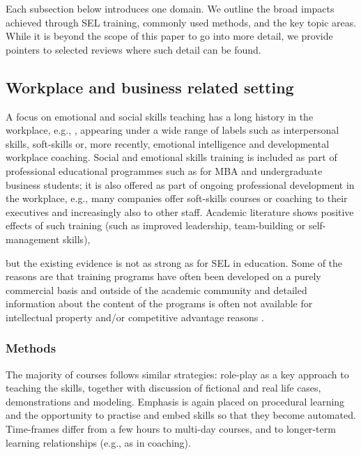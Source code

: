\documentclass[prodmode,acmtochi]{acmsmall}
\newcommand{\GeraldineFIX}[1]{}
\begin{document}
Each subsection below introduces one domain. We outline the broad impacts achieved through SEL training, commonly used methods, and the key topic areas. While it is beyond the scope of this paper to go into more detail, we provide pointers to selected reviews where such detail can be found.
 
  

\subsection{Workplace and business related setting}

A focus on emotional and social skills teaching has a long history in the workplace, e.g.,  \cite{Bailey1983,Bailey1983a}, appearing under a wide range of labels such as interpersonal skills, soft-skills or, more recently, emotional intelligence and developmental workplace coaching. Social and emotional skills training is included as part of professional educational programmes such as for MBA and undergraduate business students; it is also offered as part of ongoing professional development in the workplace, e.g., many companies offer soft-skills courses or coaching to their executives and increasingly also to other staff. 
%
Academic literature shows positive effects of such training (such as improved leadership, team-building or self-management skills),
\GeraldineFIX{G: \textbf{(G:\ SUCH\ AS???)},} 
but the existing evidence is not as strong as for SEL in education. Some of the reasons are that training programs have often been developed on a purely commercial basis and outside of the academic community  and detailed information about the content of the programs is often not available for intellectual property and/or competitive advantage reasons \cite{Walter2011,Clarke2006,Riggio2003}. 




\subsubsection*{Methods} The majority of courses follows similar strategies: role-play as a key approach to teaching the skills, together with discussion of fictional and real life cases, demonstrations and modeling. Emphasis is again placed on procedural learning and the opportunity to practise and embed skills so that they become automated. Time-frames differ from a few hours to multi-day courses, and to longer-term learning relationships (e.g., as in coaching). 
\end{document}
